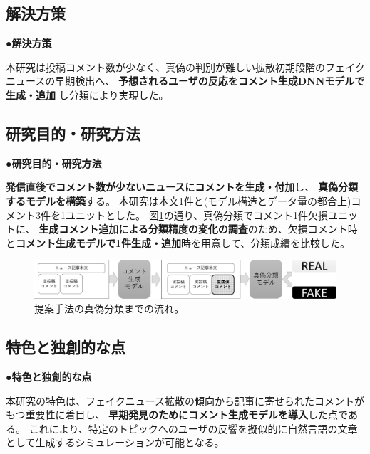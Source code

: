 {	\subsection{解決方策}
	\noindent
	●\textbf{解決方策}

	本研究は投稿コメント数が少なく、真偽の判別が難しい拡散初期段階のフェイクニュースの早期検出へ、
	\textbf{予想されるユーザの反応をコメント生成DNNモデルで生成・追加}
	し分類により実現した。

	\subsection{研究目的・研究方法}
	\noindent
	●\textbf{研究目的・研究方法}

	\textbf{発信直後でコメント数が少ないニュースにコメントを⽣成・付加}し、
	\textbf{真偽分類するモデルを構築}する。
	本研究は本文1件と(モデル構造とデータ量の都合上)コメント3件を1ユニットとした。
	図\ref{fig:model}の通り、真偽分類でコメント1件欠損ユニットに、
	\textbf{⽣成コメント追加による分類精度の変化の調査}のため、欠損コメント時と\textbf{コメント生成モデルで1件生成・追加}時を用意して、分類成績を比較した。
	
	\begin{figure}[ht]
		\centering
		\includegraphics[width=0.95\linewidth]{figs/model.pdf}
		\vspace*{-3mm}
		\caption{提案手法の真偽分類までの流れ。}
		\label{fig:model}
	\end{figure}
	\vspace*{-4mm}
	\subsection{特色と独創的な点}
	\noindent
	●\textbf{特色と独創的な点}

	本研究の特⾊は、フェイクニュース拡散の傾向から記事に寄せられたコメントがもつ重要性に着目し、
	\textbf{早期発⾒のためにコメント⽣成モデルを導⼊}した点である。
	これにより、特定のトピックへのユーザの反響を擬似的に自然言語の文章として生成するシミュレーションが可能となる。

}
